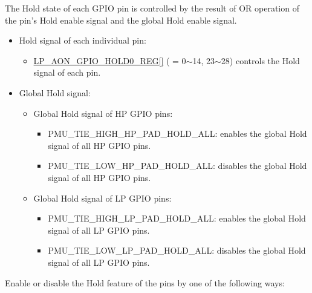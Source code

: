 \documentclass[main\_\_EN.tex]{subfiles}
\begin{document}
The Hold state of each GPIO pin is controlled by the result of OR operation of the pin's Hold enable signal and the global Hold enable signal.
\begin{itemize}
    \item Hold signal of each individual pin:
    \begin{itemize}
        \item \hyperref[regdesc:LPAONGPIOHOLD0REG]{LP\_AON\_GPIO\_HOLD0\_REG[]} ( = 0$\sim$14, 23$\sim$28) controls the Hold signal of each pin.
        \end{itemize}
    \item Global Hold signal:
        \begin{itemize}
            \item Global Hold signal of HP GPIO pins:
            \begin{itemize}
                \item PMU\_TIE\_HIGH\_HP\_PAD\_HOLD\_ALL: enables the global Hold signal of all HP GPIO pins.
                \item PMU\_TIE\_LOW\_HP\_PAD\_HOLD\_ALL: disables the global Hold signal of all HP GPIO pins.
            \end{itemize}
            \item Global Hold signal of LP GPIO pins:
            \begin{itemize}
                \item PMU\_TIE\_HIGH\_LP\_PAD\_HOLD\_ALL: enables the global Hold signal of all LP GPIO pins.
                \item PMU\_TIE\_LOW\_LP\_PAD\_HOLD\_ALL: disables the global Hold signal of all LP GPIO pins.
            \end{itemize}
        \end{itemize}
    \end{itemize}
Enable or disable the Hold feature of the pins by one of the following ways:
\end{document}

